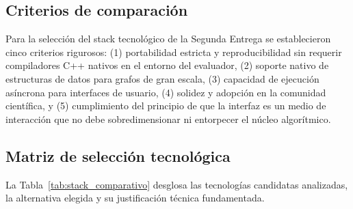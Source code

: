 \documentclass[11pt,a4paper]{article}
\begin{document}
\subsection{Criterios de comparación}
Para la selección del stack tecnológico de la Segunda Entrega se establecieron cinco criterios rigurosos: (1) portabilidad estricta y reproducibilidad sin requerir compiladores C++ nativos en el entorno del evaluador, (2) soporte nativo de estructuras de datos para grafos de gran escala, (3) capacidad de ejecución asíncrona para interfaces de usuario, (4) solidez y adopción en la comunidad científica, y (5) cumplimiento del principio de que la interfaz es un medio de interacción que no debe sobredimensionar ni entorpecer el núcleo algorítmico.

\subsection{Matriz de selección tecnológica}
La Tabla~\ref{tab:stack_comparativo} desglosa las tecnologías candidatas analizadas, la alternativa elegida y su justificación técnica fundamentada.
\end{document}
